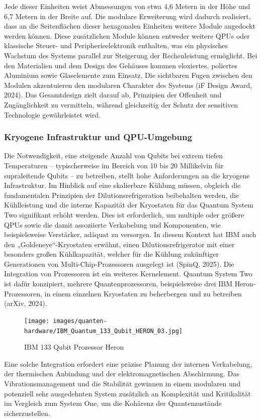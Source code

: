 Jede dieser Einheiten weist Abmessungen von etwa 4,6 Metern in der Höhe und 6,7 Metern in der Breite auf. Die modulare Erweiterung wird dadurch realisiert, dass an die Seitenflächen dieser hexagonalen Einheiten weitere Module angedockt werden können. Diese zusätzlichen Module können entweder weitere QPUs oder klassische Steuer- und Peripherieelektronik enthalten, was ein physisches Wachstum des Systems parallel zur Steigerung der Rechenleistung ermöglicht. Bei den Materialien und dem Design des Gehäuses kommen eloxiertes, poliertes Aluminium sowie Glaselemente zum Einsatz. Die sichtbaren Fugen zwischen den Modulen akzentuieren den modularen Charakter des Systems (iF Design Award, 2024). Das Gesamtdesign zielt darauf ab, Prinzipien der Offenheit und Zugänglichkeit zu vermitteln, während gleichzeitig der Schutz der sensitiven Technologie gewährleistet wird.

\subsubsection{Kryogene Infrastruktur und QPU-Umgebung}
Die Notwendigkeit, eine steigende Anzahl von Qubits bei extrem tiefen Temperaturen – typischerweise im Bereich von 10 bis 20 Millikelvin für supraleitende Qubits – zu betreiben, stellt hohe Anforderungen an die kryogene Infrastruktur. Im Hinblick auf eine skalierbare Kühlung müssen, obgleich die fundamentalen Prinzipien der Dilutionsrefrigeration beibehalten werden, die Kühlleistung und die interne Kapazität der Kryostaten für das Quantum System Two signifikant erhöht werden. 
Dies ist erforderlich, um multiple oder größere QPUs sowie die damit assoziierte Verkabelung und Komponenten, wie beispielsweise Verstärker, adäquat zu versorgen. In diesem Kontext hat IBM auch den „Goldeneye“-Kryostaten erwähnt, einen Dilutionsrefrigerator mit einer besonders großen Kühlkapazität, welcher für die Kühlung zukünftiger Generationen von Multi-Chip-Prozessoren ausgelegt ist (SpinQ, 2025). %
Die Integration von Prozessoren ist ein weiteres Kernelement. Quantum System Two ist dafür konzipiert, mehrere Quantenprozessoren, beispielsweise drei IBM Heron-Prozessoren, in einem einzelnen Kryostaten zu beherbergen und zu betreiben (arXiv, 2024). 
\begin{figure}[H]
    \centering
    \texttt{[image: images/quanten-hardware/IBM\_Quantum\_133\_Qubit\_HERON\_03.jpg]}
    \caption{IBM 133 Qubit Prozessor Heron}
    \label{fig:ibmheron}
\end{figure}
Eine solche Integration erfordert eine präzise Planung der internen Verkabelung, der thermischen Anbindung und der elektromagnetischen Abschirmung. Das Vibrationsmanagement und die Stabilität gewinnen in einem modularen und potenziell sehr ausgedehnten System zusätzlich an Komplexität und Kritikalität im Vergleich zum System One, um die Kohärenz der Quantenzustände sicherzustellen.

